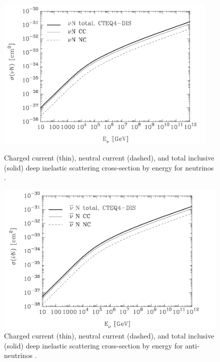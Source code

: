 \documentclass{gatech-thesis}
\begin{document}
\begin{figure}[ht]
\centering
\begin{minipage}[b]{0.45\linewidth}
\includegraphics[width=0.95\textwidth]{DIS_CS_Neutrino.png}
\caption{Charged current (thin), neutral current (dashed), and total inclusive (solid) deep inelastic scattering cross-section by energy for neutrinos \cite{Gandhi:1998ri}.}
\label{fig:NeutrinoDIS_CS}
\end{minipage}
\quad
\begin{minipage}[b]{0.45\linewidth}

\includegraphics[width=1.0\textwidth]{DIS_CS_AntiNeutrino.png}

\caption{Charged current (thin), neutral current (dashed), and total inclusive (solid) deep inelastic scattering cross-section by energy for anti-neutrinos \cite{Gandhi:1998ri}.}
\label{fig:AntiNeutrinoDIS_CS}
\end{minipage}
\end{figure}
\end{document}
